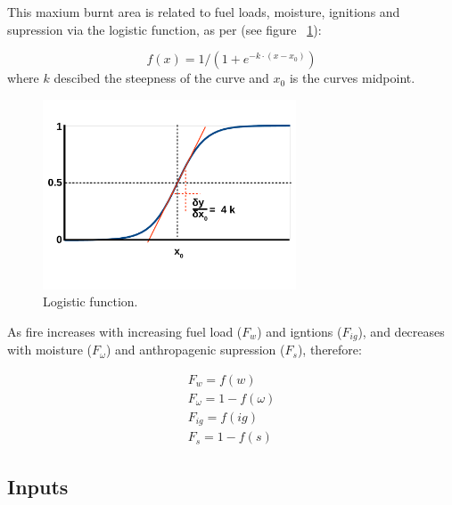 This maxium burnt area is related to fuel loads, moisture, ignitions and supression via the logistic function, as per \citet{bistinas2014causal} (see figure ~\ref{Logistic_fun_fig}):

\begin{equation}
    f(x) = 1 / (1 + e^{-k \cdot (x - x_0)})
\end{equation}
where $k$ descibed the steepness of the curve and $x_0$ is the curves midpoint.

\begin{figure}[!ht]
  \centering
    \includegraphics[width=0.67\textwidth]{Logistic_fun.pdf}
  \caption{Logistic function.}
  \label{Logistic_fun_fig}
\end{figure}

As fire increases with increasing fuel load ($F_w$) and igntions ($F_{ig}$), and decreases with moisture ($F_{\omega}$) and anthropagenic supression ($F_s$), therefore:

\begin{equation}
    \begin{split}
        F_{w} = f(w) \\
        F_{\omega} = 1 - f(\omega) \\
        F_{ig} = f(ig) \\
        F_{s} = 1- f(s)
    \end{split}
\end{equation}



\subsection{Inputs}

